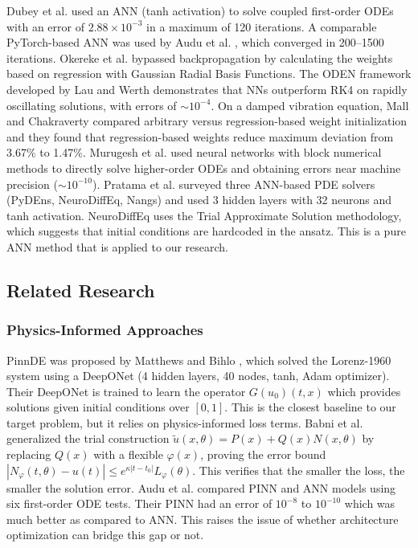 Dubey et al. \cite{dubey2024solving} used an ANN (tanh activation) to solve coupled first-order ODEs with an error of $2.88 \times 10^{-3}$ in a maximum of 120 iterations. A comparable PyTorch-based ANN was used by Audu et al. \cite{audu2024utilizing}, which converged in 200--1500 iterations. Okereke et al. \cite{okereke2021novel} bypassed backpropagation by calculating the weights based on regression with Gaussian Radial Basis Functions. The ODEN framework developed by Lau and Werth \cite{lau2020oden} demonstrates that NNs outperform RK4 on rapidly oscillating solutions, with errors of $\sim 10^{-4}$. On a damped vibration equation, Mall and Chakraverty \cite{mall2013comparison} compared arbitrary versus regression-based weight initialization and they found that regression-based weights reduce maximum deviation from 3.67\% to 1.47\%. Murugesh et al. \cite{murugesh2025novel} used neural networks with block numerical methods to directly solve higher-order ODEs and obtaining errors near machine precision ($\sim 10^{-10}$). Pratama et al. \cite{pratama2022ann} surveyed three ANN-based PDE solvers (PyDEns, NeuroDiffEq, Nangs) and used 3 hidden layers with 32 neurons and tanh activation. NeuroDiffEq uses the Trial Approximate Solution methodology, which suggests that initial conditions are hardcoded in the ansatz. This is a pure ANN method that is applied to our research.


\subsection{Related Research}

\subsubsection{Physics-Informed Approaches}

PinnDE was proposed by Matthews and Bihlo \cite{matthews2024pinnde}, which solved the Lorenz-1960 system using a DeepONet (4 hidden layers, 40 nodes, tanh, Adam optimizer). Their DeepONet is trained to learn the operator $G(u_0)(t, x)$ which provides solutions given initial conditions over $[0, 1]$. This is the closest baseline to our target problem, but it relies on physics-informed loss terms. Babni et al. \cite{babni2025error} generalized the trial construction $\tilde{u}(x, \theta) = P(x) + Q(x)N(x, \theta)$ by replacing $Q(x)$ with a flexible $\varphi(x)$, proving the error bound $|N_\varphi(t, \theta) - u(t)| \leq e^{\kappa|t - t_0|} L_\varphi(\theta)$. This verifies that the smaller the loss, the smaller the solution error. Audu et al. \cite{audu2026neural} compared PINN and ANN models using six first-order ODE tests. Their PINN had an error of $10^{-8}$ to $10^{-10}$ which was much better as compared to ANN. This raises the issue of whether architecture optimization can bridge this gap or not.

